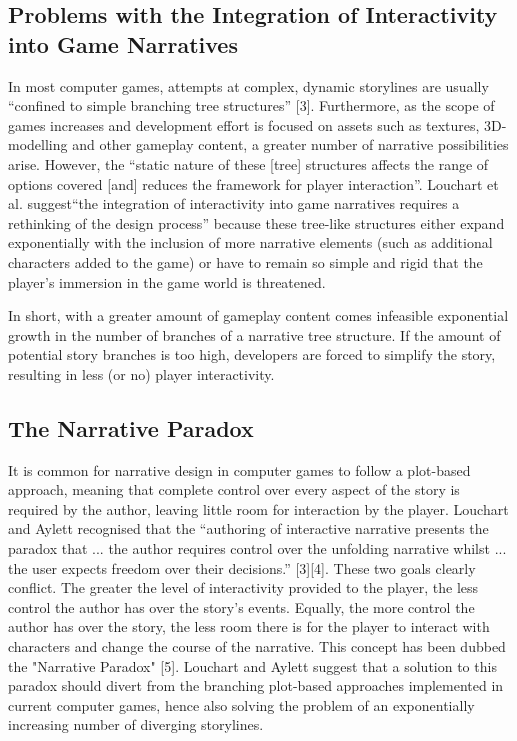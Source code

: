 \documentclass{sig-alternate-05-2015}
\begin{document}
\subsection{Problems with the Integration of Interactivity into Game Narratives}

In most computer games, attempts at complex, dynamic storylines are usually ``confined to simple branching tree structures'' [3]. Furthermore, as the scope of games increases and development effort is focused on assets such as textures, 3D-modelling and other gameplay content, a greater number of narrative possibilities arise. However, the ``static nature of these [tree] structures affects the range of options covered [and] reduces the framework for player interaction''. Louchart et al. suggest``the integration of interactivity into game narratives requires a rethinking of the design process'' because these tree-like structures either expand exponentially with the inclusion of more narrative elements (such as additional characters added to the game) or have to remain so simple and rigid that the player's immersion in the game world is threatened.

In short, with a greater amount of gameplay content comes infeasible exponential growth in the number of branches of a narrative tree structure. If the amount of potential story branches is too high, developers are forced to simplify the story, resulting in less (or no) player interactivity.

\subsection{The Narrative Paradox}

It is common for narrative design in computer games to follow a plot-based approach, meaning that complete control over every aspect of the story is required by the author, leaving little room for interaction by the player. Louchart and Aylett recognised that the ``authoring of interactive narrative presents the paradox that ... the author requires control over the unfolding narrative whilst ... the user expects freedom over their decisions.'' [3][4]. These two goals clearly conflict. The greater the level of interactivity provided to the player, the less control the author has over the story's events. Equally, the more control the author has over the story, the less room there is for the player to interact with characters and change the course of the narrative. This concept has been dubbed the "Narrative Paradox" [5]. Louchart and Aylett suggest that a solution to this paradox should divert from the branching plot-based approaches implemented in current computer games, hence also solving the problem of an exponentially increasing number of diverging storylines.
\end{document}
